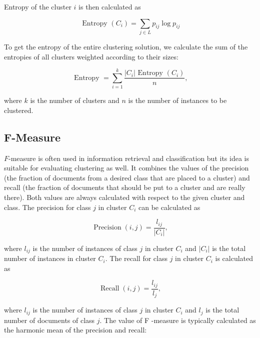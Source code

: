 Entropy of the cluster $i$ is then calculated as


\begin{equation*}
\text { Entropy }\left(C_{i}\right)=\sum_{j \in L} p_{i j} \log p_{i j} \tag{12.43}
\end{equation*}


To get the entropy of the entire clustering solution, we calculate the sum of the entropies of all clusters weighted according to their sizes:


\begin{equation*}
\text { Entropy }=\sum_{i=1}^{k} \frac{\left|C_{i}\right| \text { Entropy }\left(C_{i}\right)}{n}, \tag{12.44}
\end{equation*}


where $k$ is the number of clusters and $n$ is the number of instances to be clustered.

\subsection{F-Measure}
$F$-measure is often used in information retrieval and classification but its idea is suitable for evaluating clustering as well. It combines the values of the precision (the fraction of documents from a desired class that are placed to a cluster) and recall (the fraction of documents that should be put to a cluster and are really there). Both values are always calculated with respect to the given cluster and class. The precision for class $j$ in cluster $C_{i}$ can be calculated as


\begin{equation*}
\operatorname{Precision}(i, j)=\frac{l_{i j}}{\left|C_{i}\right|}, \tag{12.45}
\end{equation*}


where $l_{i j}$ is the number of instances of class $j$ in cluster $C_{i}$ and $\left|C_{i}\right|$ is the total number of instances in cluster $C_{i}$. The recall for class $j$ in cluster $C_{i}$ is calculated as


\begin{equation*}
\operatorname{Recall}(i, j)=\frac{l_{i j}}{l_{j}}, \tag{12.46}
\end{equation*}


where $l_{i j}$ is the number of instances of class $j$ in cluster $C_{i}$ and $l_{j}$ is the total number of documents of class $j$. The value of F -measure is typically calculated as the harmonic mean of the precision and recall:


